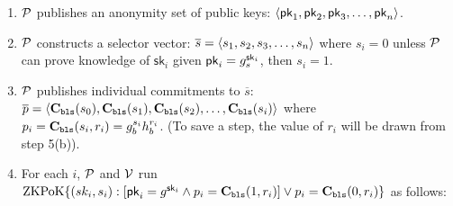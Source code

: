 
\begin{Protocol*}[t!]
\begin{framed}
\footnotesize
\begin{enumerate}
\item $\mathcal{P}$ publishes an anonymity set of public keys: $\left \langle \mathsf{pk}_1,\mathsf{pk}_2,\mathsf{pk}_3,\dots,\mathsf{pk}_n \right \rangle$.
\item $\mathcal{P}$ constructs a selector vector: $\overline{s}=\left \langle s_1,s_2,s_3,\ldots,s_n \right \rangle$ where $s_i=0$ unless $\mathcal{P}$ can prove knowledge of $\mathsf{sk}_i$ given $\mathsf{pk}_i=g_s^{\mathsf{sk}_i}$, then  $s_i=1$.
\item $\mathcal{P}$ publishes individual commitments to $\overline{s}$: $\overline{p}=\left \langle \textbf{C}_\texttt{bls}(s_0),\textbf{C}_\texttt{bls}(s_1),\textbf{C}_\texttt{bls}(s_2),\ldots,\textbf{C}_\texttt{bls}(s_i) \right \rangle$ where  $p_i=\textbf{C}_\texttt{bls}(s_i,r_i)=g_b^{s_i}h_b^{r_i}$. (To save a step, the value of $r_i$ will be drawn from step 5(b)).

\item For each $i$, $\mathcal{P}$ and $\mathcal{V}$ run $\mathrm{ZKPoK} \{ (sk_i,s_i) :  [\mathsf{pk}_i=g^{\mathsf{sk}_i} \land p_i=\textbf{C}_\texttt{bls}(1,r_i)  ] \lor p_i=\textbf{C}_\texttt{bls}(0,r_i) \}$ as follows:

\begin{enumerate}   
\end{enumerate}
\end{enumerate}
\end{framed}
\end{Protocol*}
